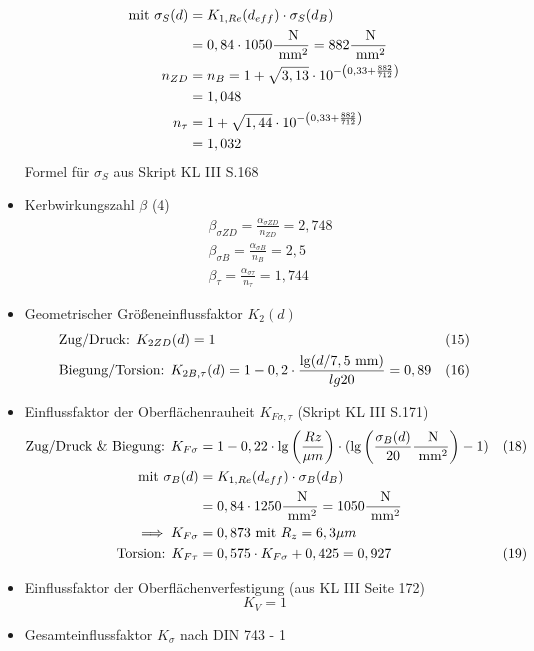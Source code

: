 \begin{itemize}
\begin{align*}
		\text{mit } \sigma_S (d) &= K_{1,Re} (d_{eff}) \cdot \sigma_S (d_B) \\
		&= 0,84 \cdot 1050 \frac{\text{ N}}{\text{ mm}^2} = 882 \frac{\text{ N}}{\text{ mm}^2} \\
		n_{ZD} &= n_B = 1 + \sqrt{3,13} \cdot 10 ^{-\left( 0,33 + \frac{882}{712} \right)} \\
		&=1,048 \\
		n_{\tau} &= 1 + \sqrt{1,44} \cdot 10 ^{-\left( 0,33 + \frac{882}{712} \right)} \\
		&= 1,032 
	\end{align*}
	Formel für $\sigma_S$ aus Skript KL III  S.168
\item Kerbwirkungszahl $\beta$ \hfill (4)
	\begin{align*}
		&\beta_{\sigma ZD} = \frac{\alpha_{\sigma ZD}}{n_{ZD}} = 2,748 \\
		&\beta_{\sigma B} = \frac{\alpha_{\sigma B}}{n_{B}} = 2,5 \\
		&\beta_{ \tau} = \frac{\alpha_{\sigma \tau}}{n_{\tau}} = 1,744 
	\end{align*}
\item Geometrischer Größeneinflussfaktor $K_2 (d)$ 
	\begin{align*}
		&\text{Zug/Druck: }K_{2ZD} (d) = 1 & (15) \\
		&\text{Biegung/Torsion: } K_{2B,\tau} (d) = 1 -0,2 \cdot  \frac{\lg (d / 7,5 \text{ mm})}{lg 20}  = 0,89 &(16) 
	\end{align*}
\item Einflussfaktor der Oberflächenrauheit $K_{F\sigma, \tau}$ (Skript KL III  S.171)
	\begin{align*}
		\text{Zug/Druck \& Biegung: } K_{F\sigma} &= 1 - 0,22 \cdot \lg \left( \frac{Rz}{\mu m}\right) \cdot ( \lg \left( \frac{\sigma_B (d)}{20}\frac{\text{ N}}{\text{ mm}^2}\right) -1 ) &(18) \\
		\text{mit } \sigma_B (d) &= K_{1,Re} (d_{eff}) \cdot \sigma_B (d_B) \\
		&= 0,84 \cdot 1250\frac{\text{ N}}{\text{ mm}^2} = 1050 \frac{\text{ N}}{\text{ mm}^2} \\
		\implies K_{F\sigma} &= 0,873 \text{ mit } R_z = 6,3 \mu m\\
		\text{Torsion: } K_{F\tau} &= 0,575 \cdot K_{F\sigma} +0,425 = 0,927 & (19) 
	\end{align*}
\item Einflussfaktor der Oberflächenverfestigung (aus KL III  Seite 172)
	\[
		K_{V} = 1
	\]
\item Gesamteinflussfaktor $K_{\sigma}$ nach DIN 743 - 1

\end{itemize}
